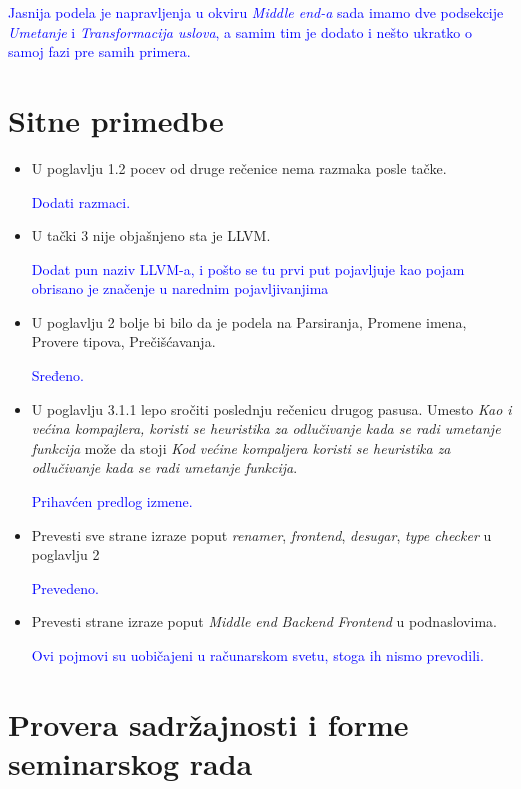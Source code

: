 \documentclass[a4paper]{report}
\newcommand{\odgovor}[1]{\textcolor{blue}{#1}}
\begin{document}
	\odgovor{Jasnija podela je napravljenja u okviru \textit{Middle end-a} sada imamo dve podsekcije \textit{Umetanje} i \textit{Transformacija uslova}, a samim tim je dodato i nešto ukratko o samoj fazi pre samih primera.}
	
	
	\section{Sitne primedbe}
	\begin{itemize}
		\item U poglavlju 1.2 pocev od druge rečenice nema razmaka posle tačke.
		
		\odgovor{Dodati razmaci.}
		
		\item U tački 3 nije objašnjeno sta je LLVM.
		
		\odgovor{Dodat pun naziv LLVM-a, i pošto se tu prvi put pojavljuje kao pojam obrisano je značenje u narednim pojavljivanjima}
		
		\item U poglavlju 2 bolje bi bilo da je podela na  Parsiranja, Promene imena, Provere tipova, Prečišćavanja.
		
		\odgovor{Sređeno.}
		
		\item U poglavlju 3.1.1 lepo sročiti poslednju rečenicu drugog pasusa. Umesto \emph{Kao i većina kompajlera, koristi se heuristika za odlučivanje kada se radi umetanje funkcija} može da stoji \emph{Kod većine kompaljera koristi se heuristika za odlučivanje kada se radi umetanje funkcija}.
		
		\odgovor{Prihavćen predlog izmene.}
		
		\item Prevesti sve strane izraze poput \emph{renamer}, \emph{frontend}, \emph{desugar}, \emph{type checker} u poglavlju 2
		
		\odgovor{Prevedeno.}
		
		\item Prevesti strane izraze poput \emph{Middle end} \emph{Backend} \emph{Frontend} u podnaslovima.
		
		\odgovor{Ovi pojmovi su uobičajeni u računarskom svetu, stoga ih nismo prevodili.}
		
	\end{itemize}
	\section{Provera sadržajnosti i forme seminarskog rada}
	
\end{document}
